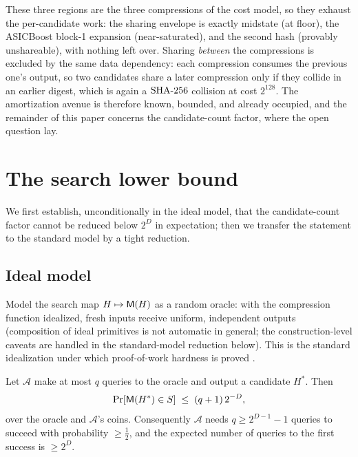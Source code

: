 \documentclass[11pt]{article}
\begin{document}
These three regions are the three compressions of the cost model, so they
exhaust the per-candidate work: the sharing envelope is exactly midstate
(at floor), the ASICBoost block-1 expansion (near-saturated), and the
second hash (provably unshareable), with nothing left over. Sharing
\emph{between} the compressions is excluded by the same data dependency:
each compression consumes the previous one's output, so two candidates
share a later compression only if they collide in an earlier digest, which
is again a $\mathrm{SHA\text{-}256}$ collision at cost $2^{128}$. The
amortization avenue is therefore known, bounded, and already occupied,
and the remainder of this paper concerns the candidate-count factor,
where the open question lay.

\section{The search lower bound}\label{sec:search}

We first establish, unconditionally in the ideal model, that the
candidate-count factor cannot be reduced below $2^{D}$ in expectation;
then we transfer the statement to the standard model by a tight
reduction.

\subsection{Ideal model}

Model the search map $H\mapsto\mathsf{M}(H)$ as a random oracle: with the
compression function idealized, fresh inputs receive uniform, independent
outputs (composition of ideal primitives is not automatic in general; the
construction-level caveats are handled in the standard-model reduction
below). This is the standard idealization under which proof-of-work
hardness is proved \cite{backbone}.

\begin{theorem}\label{thm:rom}
Let $\mathcal{A}$ make at most $q$ queries to the oracle and output a
candidate $H^\ast$. Then
\[
  \Pr[\mathsf{M}(H^\ast)\in S] \;\le\; (q+1)\,2^{-D},
\]
over the oracle and $\mathcal{A}$'s coins. Consequently $\mathcal{A}$
needs $q \ge 2^{D-1}-1$ queries to succeed with probability $\ge \tfrac12$,
and the expected number of queries to the first success is
$\ge 2^{D}$.
\end{theorem}
\end{document}
